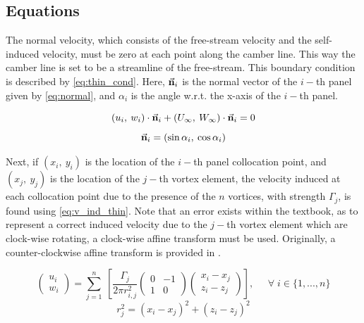 \subsection{Equations}
The normal velocity, which consists of the free-stream velocity and the
self-induced velocity, must be zero at each point along the camber line. This
way the camber line is set to be a streamline of the free-stream. This
boundary condition is described by \autoref{eq:thin_cond}. Here,
$\vec{\bf{n}}_i$ is the normal vector of the $i-$th panel given by
\autoref{eq:normal}, and $\alpha_i$ is the angle w.r.t. the x-axis of the $i-$th
panel.

\begin{equation}
\label{eq:thin_cond}
    \left( u_i, \: w_i \right) \cdot \vec{\bf{n}}_i + \left( U_\infty,
    \: W_\infty \right) \cdot  \vec{\bf{n}}_i = 0
\end{equation}
\begin{equation}
\label{eq:normal}
    \vec{\bf{n}}_i = \left( \sin \alpha_i, \: \cos \alpha_i \right)
\end{equation}

Next, if $\left( x_i, \: y_i \right)$ is the location of the $i-$th panel
collocation point, and $\left( x_j, \: y_j \right)$ is the location of the
$j-$th vortex element, the velocity induced at each collocation point due to
the presence of the $n$ vortices, with strength $\Gamma_j$, is found using
\autoref{eq:v_ind_thin}. Note that an error exists within the textbook, as to
represent a correct induced velocity due to the $j-$th vortex element which are
clock-wise rotating, a clock-wise affine transform must be used. Originally, a
counter-clockwise affine transform is provided in \cite{katz_plotkin}.
\medskip

\begin{equation}
\label{eq:v_ind_thin}
    \left(\begin{array}{l}
    u_i \\ w_i
    \end{array}\right)
    =
    \sum_{j=1}^{n} \:
    \left[ \frac{\Gamma_{j}}{2 \pi r_{i,j}^{2}}
    \left(\begin{array}{cc}
    0 & -1 \\ 1 & 0
    \end{array}\right)
    \left(\begin{array}{l}
    x_i-x_{j} \\ z_i-z_{j}
    \end{array}\right) \right], \; \; \; \; \; \forall \; i \in \{1,...,n\}
\end{equation}
\begin{equation}r_{j}^{2}=\left(x_i-x_j\right)^{2}+\left(z_i-z_j\right)^{2}\end{equation}
\medskip

